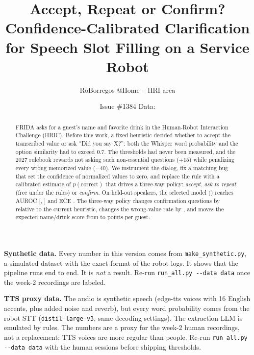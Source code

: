 \documentclass[10pt,a4paper]{article}
\title{Accept, Repeat or Confirm?\\
\large Confidence-Calibrated Clarification for Speech Slot Filling on a Service Robot}
\author{RoBorregos @Home -- HRI area}
\date{Issue \#1384 \quad Data: \DataSource}
\newcommand{\code}[1]{\texttt{#1}}
\begin{document}
\maketitle

\ifnum{}
\begin{center}
\colorbox{warnbg}{\parbox{0.92\linewidth}{\color{warnfg}\small\textbf{Synthetic data.}
Every number in this version comes from \code{make\_synthetic.py}, a simulated dataset with the exact
format of the robot logs. It shows that the pipeline runs end to end. It is \emph{not} a result. Re-run
\code{run\_all.py -{}-data data} once the week-2 recordings are labeled.}}
\end{center}
\fi
\ifnum{}
\begin{center}
\colorbox{warnbg}{\parbox{0.92\linewidth}{\color{warnfg}\small\textbf{TTS proxy data.}
The audio is synthetic speech (edge-tts voices with 16 English accents, plus added noise and reverb),
but every word probability comes from the robot STT (\code{distil-large-v3}, same decoding settings).
The extraction LLM is emulated by rules. The numbers are a proxy for the week-2 human recordings, not a
replacement: TTS voices are more regular than people. Re-run \code{run\_all.py -{}-data data} with the
human sessions before shipping thresholds.}}
\end{center}
\fi

\begin{abstract}
FRIDA asks for a guest's name and favorite drink in the Human-Robot Interaction Challenge (HRIC). Before this
work, a fixed heuristic decided whether to accept the transcribed value or ask ``Did you say X?'': both the
Whisper word probability and the option similarity had to exceed $0.7$. The thresholds had never been measured,
and the 2027 rulebook rewards not asking such non-essential questions ($+15$) while penalizing every wrong
memorized value ($-40$). We instrument the dialog, fix a matching bug that set the confidence of normalized
values to zero, and replace the rule with a calibrated estimate of $p(\text{correct})$ that drives a three-way
policy: \emph{accept}, \emph{ask to repeat} (free under the rules) or \emph{confirm}. On held-out speakers, the
selected model (\WThreeSelected) reaches AUROC \WThreeAUROC{} [\WThreeAUROCLo, \WThreeAUROCHi] and ECE
\WThreeECE. The three-way policy changes confirmation questions by \HThreeConfirmReduction{} relative to
the current heuristic, changes the wrong-value rate by \HThreeWrongDelta{}, and moves the expected name/drink
score from \HThreeScoreLegacy{} to \HThreeScoreBest{} points per guest.
\end{abstract}
\end{document}
